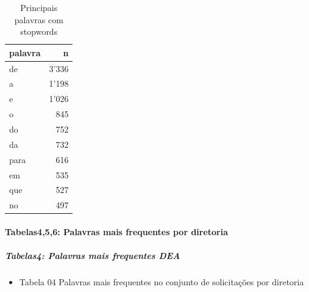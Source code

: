 \documentclass[]{article}
\providecommand{\tightlist}{%
  \setlength{\itemsep}{0pt}\setlength{\parskip}{0pt}}
\let\oldparagraph\paragraph
\renewcommand{\paragraph}[1]{\oldparagraph{#1}\mbox{}}
\let\oldsubparagraph\subparagraph
\renewcommand{\subparagraph}[1]{\oldsubparagraph{#1}\mbox{}}
\begin{document}
\begin{table}[!h]

\caption{\label{tab:unnamed-chunk-21}Principais palavras com stopwords}
\centering
\begin{tabular}{lr}
\toprule
palavra & n\\
\midrule
\rowcolor{gray!6}  de & 3'336\\
a & 1'198\\
\rowcolor{gray!6}  e & 1'026\\
o & 845\\
\rowcolor{gray!6}  do & 752\\
\addlinespace
da & 732\\
\rowcolor{gray!6}  para & 616\\
em & 535\\
\rowcolor{gray!6}  que & 527\\
no & 497\\
\bottomrule
\end{tabular}
\end{table}

\paragraph{Tabelas4,5,6: Palavras mais frequentes por
diretoria}\label{tabelas456-palavras-mais-frequentes-por-diretoria}

\subparagraph{Tabelas4: Palavras mais frequentes
DEA}\label{tabelas4-palavras-mais-frequentes-dea}

\begin{itemize}
\tightlist
\item
  Tabela 04 Palavras mais frequentes no conjunto de solicitações por
  diretoria
\end{itemize}
\end{document}
